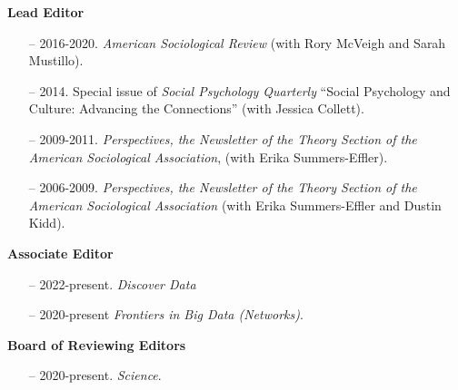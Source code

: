 \noindent\textbf{Lead Editor}

\begin{itemize}[itemsep=-0.5ex]
    \item[--] 2016-2020. {\em American Sociological Review} (with Rory McVeigh and Sarah Mustillo).
    \item[--] 2014. Special issue of {\em Social Psychology Quarterly} ``Social Psychology and Culture: Advancing the Connections'' (with Jessica Collett).
    \item[--] 2009-2011. \emph{Perspectives, the Newsletter of the Theory Section of the  American Sociological Association}, (with Erika Summers-Effler). 
    \item[--] 2006-2009. \emph{Perspectives, the Newsletter of the Theory Section of the  American Sociological Association} (with Erika Summers-Effler and Dustin Kidd). 
\end{itemize}

\noindent\textbf{Associate Editor} 
\begin{itemize}[itemsep=-0.5ex]
    \item[--] 2022-present. {\em Discover Data}
    \item[--] 2020-present {\em Frontiers in Big Data (Networks)}.
\end{itemize}

\noindent\textbf{Board of Reviewing Editors} 
\begin{itemize}[itemsep=-0.5ex]
    \item[--] 2020-present. {\em Science}.
\end{itemize}

